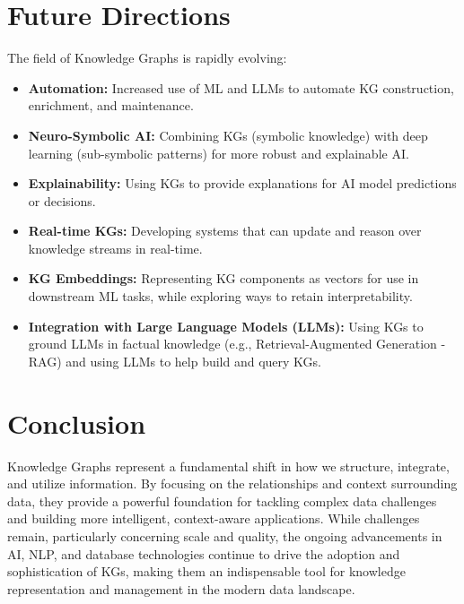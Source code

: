 \documentclass[11pt, a4paper]{article}
\begin{document}
\section{Future Directions}
\label{sec:future}

The field of Knowledge Graphs is rapidly evolving:
\begin{itemize}
    \item \textbf{Automation:} Increased use of ML and LLMs to automate KG construction, enrichment, and maintenance.
    \item \textbf{Neuro-Symbolic AI:} Combining KGs (symbolic knowledge) with deep learning (sub-symbolic patterns) for more robust and explainable AI.
    \item \textbf{Explainability:} Using KGs to provide explanations for AI model predictions or decisions.
    \item \textbf{Real-time KGs:} Developing systems that can update and reason over knowledge streams in real-time.
    \item \textbf{KG Embeddings:} Representing KG components as vectors for use in downstream ML tasks, while exploring ways to retain interpretability.
    \item \textbf{Integration with Large Language Models (LLMs):} Using KGs to ground LLMs in factual knowledge (e.g., Retrieval-Augmented Generation - RAG) and using LLMs to help build and query KGs.
\end{itemize}

\section{Conclusion}
\label{sec:conclusion}

Knowledge Graphs represent a fundamental shift in how we structure, integrate, and utilize information. By focusing on the relationships and context surrounding data, they provide a powerful foundation for tackling complex data challenges and building more intelligent, context-aware applications. While challenges remain, particularly concerning scale and quality, the ongoing advancements in AI, NLP, and database technologies continue to drive the adoption and sophistication of KGs, making them an indispensable tool for knowledge representation and management in the modern data landscape.

\clearpage

\printbibliography[heading=bibintoc]
\end{document}
